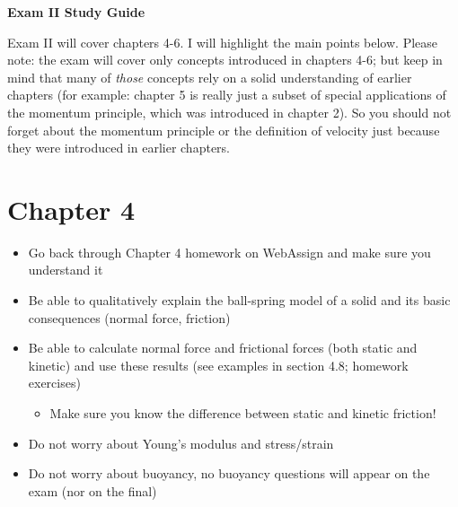 \documentclass{article}
\begin{document}
\fancyfoot[C]{\thepage}
\vspace*{0cm}
\begin{center}
	{\LARGE \textbf{Exam II Study Guide}}\\
	\vspace{0.25cm}
\end{center}
Exam II will cover chapters 4-6. I will highlight the main points below. Please note: the exam will cover only concepts introduced in chapters 4-6; but keep in mind that many of \textit{those} concepts rely on a solid understanding of earlier chapters (for example: chapter 5 is really just a subset of special applications of the momentum principle, which was introduced in chapter 2). So you should not forget about the momentum principle or the definition of velocity just because they were introduced in earlier chapters. 
\section*{Chapter 4}
\begin{itemize}
	\item Go back through Chapter 4 homework on WebAssign and make sure you understand it
	\item Be able to qualitatively explain the ball-spring model of a solid and its basic consequences (normal force, friction)
	\item Be able to calculate normal force and frictional forces (both static and kinetic) and use these results (see examples in section 4.8; homework exercises)
	\begin{itemize}
		\item Make sure you know the difference between static and kinetic friction!
	\end{itemize}
	\item Do not worry about Young's modulus and stress/strain
	\item Do not worry about buoyancy, no buoyancy questions will appear on the exam (nor on the final)
\end{itemize}
\end{document}
